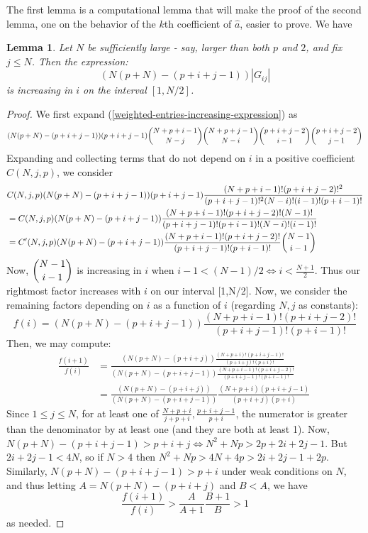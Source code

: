 \documentclass{article}
\newtheorem{lem}[thm]{Lemma}
\theoremstyle{definition}
\theoremstyle{remark}
\numberwithin{equation}{section}
\begin{document}
The first lemma is a computational lemma that will make the proof of the second lemma, one on the behavior of the $k$th coefficient of $\hat{a}$, easier to prove. We have
\begin{lem}\label{computational-inequality-lemma}
Let $N$ be sufficiently large - say, larger than both $p$ and $2$, and fix $j \le N$. Then the expression:
\begin{equation} \label{weighted-entries-increasing-expression}(N(p+N)-(p+i+j-1))|G_{ij}|\end{equation} is increasing in $i$ on the interval $[1,N/2]$.
\end{lem}
\begin{proof}
We first expand (\ref{weighted-entries-increasing-expression}) as
\[(N(p+N)-(p+i+j-1))(p+i+j-1)\dbinom{N+p+i-1}{N-j} \dbinom{N+p+j-1}{N-i} \dbinom{p+i+j-2}{i-1} \dbinom{p+i+j-2}{j-1}\]
Expanding and collecting terms that do not depend on $i$ in a positive coefficient $C(N,j,p)$, we consider 
\begin{align*}
&C(N,j,p)(N(p+N)-(p+i+j-1))(p+i+j-1) \frac{(N+p+i-1)!(p+i+j-2)!^2}{(p+i+j-1)!^2(N-i)!(i-1)!(p+i-1)!}\\
&= C(N,j,p)(N(p+N)-(p+i+j-1))\frac{(N+p+i-1)!(p+i+j-2)!(N-1)!}{(p+i+j-1)!(p+i-1)!(N-i)!(i-1)!}\\
&= C'(N,j,p)(N(p+N)-(p+i+j-1))\frac{(N+p+i-1)!(p+i+j-2)!}{(p+i+j-1)!(p+i-1)!}\dbinom{N-1}{i-1}
\end{align*} Now, $\dbinom{N-1}{i-1}$ is increasing in $i$ when $i-1 < (N-1)/2 \iff i < \frac{N+1}{2}$. Thus our rightmost factor increases with $i$ on our interval [1,N/2]. Now, we consider the remaining factors depending on $i$ as a function of $i$ (regarding $N, j$ as constants):
\[f(i) = (N(p+N)-(p+i+j-1))\frac{(N+p+i-1)!(p+i+j-2)!}{(p+i+j-1)!(p+i-1)!}\]
Then, we may compute:
\begin{align*}
\frac{f(i+1)}{f(i)} &= \frac{(N(p+N)-(p+i+j))\frac{(N+p+i)!(p+i+j-1)!}{(p+i+j)!(p+i)!}}{(N(p+N)-(p+i+j-1))\frac{(N+p+i-1)!(p+i+j-2)!}{(p+i+j-1)!(p+i-1)!}} \\
&= \frac{(N(p+N)-(p+i+j))}{(N(p+N)-(p+i+j-1))} \frac{(N+p+i)(p+i+j-1)}{(p+i+j)(p+i)}\
\end{align*}
Since $1\le j \le N$, for at least one of $\frac{N+p+i}{j+p+i}, \frac{p+i+j-1}{p+i}$, the numerator is greater than the denominator by at least one (and they are both at least 1). Now, $N(p+N)-(p+i+j-1) > p+i+j \iff N^2 +Np>2p+2i+2j-1$. But $2i+2j-1<4N$, so if $N>4$ then $N^2+Np>4N+4p>2i+2j-1+2p$. Similarly, $N(p+N)-(p+i+j-1)>p+i$ under weak conditions on $N$, and thus letting $A=N(p+N)-(p+i+j)$ and $B<A$, we have 
\[\frac{f(i+1)}{f(i)} > \frac{A}{A+1} \frac{B+1}{B} > 1\]
as needed.
\end{proof} 
\end{document}
